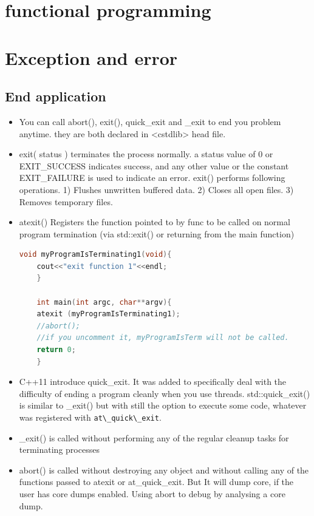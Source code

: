 \documentclass[a4paper,12pt,twoside]{book}
\begin{document}
\chapter{functional programming}

\chapter{Exception and error}
\section{End application}
\begin{itemize}
	\item You can call abort(), exit(), quick\_exit and  \_exit to end you problem anytime. they are both declared in <cstdlib> head file.
	
	\item exit( status ) terminates the process normally.
	a status value of 0 or EXIT\_SUCCESS indicates success, and any other value or the constant EXIT\_FAILURE is used to indicate an error. exit() performs following operations. 1) Flushes unwritten buffered data.
	2) Closes all open files. 3) Removes temporary files.
	
	\item atexit() Registers the function pointed to by func to be called on normal program termination (via std::exit() or returning from the main function)
	\begin{lstlisting}[frame=single, language=c++]
	void myProgramIsTerminating1(void){
	cout<<"exit function 1"<<endl;
	}
	
	int main(int argc, char**argv){
	atexit (myProgramIsTerminating1);
	//abort();
	//if you uncomment it, myProgramIsTerm will not be called.
	return 0;
	}
	\end{lstlisting}
	
	\item C++11 introduce quick\_exit. It was added to specifically deal with the difficulty of ending a program cleanly when you use threads. std::quick\_exit() is similar to \_exit() but with still the option to execute some code, whatever was registered with \verb=at\_quick\_exit=.
	
	\item \_exit() is called without performing any of the regular cleanup tasks for terminating processes
	
	\item abort() is called without destroying any object and without calling any of the functions passed to atexit or at\_quick\_exit. But It will dump core, if the user has core dumps enabled. Using abort to debug by analysing a core dump.
	

\end{itemize}
\end{document}
